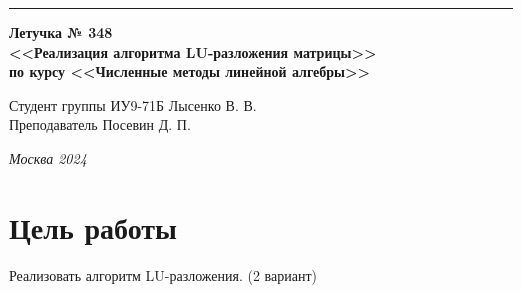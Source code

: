 \documentclass[a4paper, 14pt]{extarticle}
\begin{document}
\begin{titlepage}
\vspace*{-16pt}
\hspace{30pt}\rule{0.866\textwidth}{0.4pt}
  
\vspace{11em}

\begin{center}
\Large {\bf Летучка № 348} \\ 
\large {\bf<<Реализация алгоритма LU-разложения матрицы>>} \\ 
\large {\bf по курсу <<Численные методы линейной алгебры>>} \\ 
\end{center}\normalsize

\vspace{8em}


\begin{flushright}
  {Студент группы ИУ9-71Б Лысенко В. В.\hspace*{15pt} \\
  \vspace{2ex}
  Преподаватель Посевин Д. П.\hspace*{15pt}}
\end{flushright}

\bigskip

\vfill
 

\begin{center}
\textsl{Москва 2024}
\end{center}
\end{titlepage}

\renewcommand{\ttdefault}{pcr}

\setlength{\tabcolsep}{3pt}
\newpage
\setcounter{page}{2}

\section{Цель работы}\label{Sect::task}
\par
\renewcommand{\labelenumii}{\arabic{enumi}.\arabic{enumii}.}
Реализовать алгоритм LU-разложения. (2 вариант)
\end{document}

